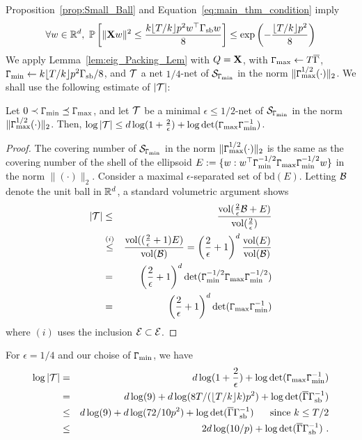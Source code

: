 Proposition~\ref{prop:Small_Ball} and Equation~\eqref{eq:main_thm_condition} imply
\begin{eqnarray}\label{eq:one_w}
\forall \direc \in \R^{d},~\Pr\left[ \|\matX \direc\|^2 \le \frac{k\lfloor T/k\rfloor p^2 \direc^\top \Gamsb \direc }{8}\right] \le \exp\left( - \frac{\floor{T/k}p^2}{8}\right) %
\end{eqnarray}
We apply Lemma~\ref{lem:eig_Packing_Lem} with $Q =  \mathbf{X}$, with $\mathtt{\Gamma}_{\max} \leftarrow T\overline{\Gamma}$, $\mathtt{\Gamma}_{\min} \leftarrow k \lfloor T/k\rfloor p^2 \Gamma_{\mathrm{sb}}/8$, and $\mathcal{T}$ a net $1/4$-net of $\mathcal{S}_{\mathtt{\Gamma}_{\min}}$ in the norm $\|\mathtt{\Gamma}_{\max}^{1/2}(\cdot)\|_2$. We shall use the following estimate of $|\mathcal{T}|$:
\begin{lem}\label{lem:covering_number} Let $0 \prec \mathtt{\Gamma}_{\min} \preceq \mathtt{\Gamma}_{\max}$, and let $\mathcal{T}$ be a minimal $\epsilon \le 1/2$-net of $\mathcal{S}_{\mathtt{\Gamma}_{\min}}$ in the norm $\|\mathtt{\Gamma}_{\max}^{1/2}(\cdot)\|_2$. Then, $\log |\mathcal{T}| \le d\log(1+\frac{2}{\epsilon}) + \log \det (\mathtt{\Gamma}_{\max} \mathtt{\Gamma}_{\min}^{-1})$. 
\end{lem}
\begin{proof} The covering number of $\mathcal{S}_{\mathtt{\Gamma}_{\min}}$ in the norm $\|\mathtt{\Gamma}_{\max}^{1/2}(\cdot)\|_2$ is the same as the covering number of the shell of the ellipsoid $E := \{w: w^{\top} \mathtt{\Gamma}_{\min}^{-1/2}\mathtt{\Gamma}_{\max} \mathtt{\Gamma}_{\min}^{-1/2}w\}$ in the norm $\|(\cdot)\|_2$. Consider a maximal $\epsilon$-separated set of $\mathrm{bd}(E)$. Letting $\mathcal{B}$ denote the unit ball in $\mathbb{R}^d$, a standard volumetric argument shows 
\begin{eqnarray*}
|\mathcal{T}| &\le& \frac{\mathrm{vol}(\frac{2}{\epsilon}\mathcal{B} + E)}{\mathrm{vol}(\frac{2}{\epsilon})} \\
&\overset{(i)}{\le}& \frac{\mathrm{vol}((\frac{2}{\epsilon}+1)E)}{\mathrm{vol}(\mathcal{B})} = \left(\frac{2}{\epsilon}+1\right)^d\frac{\mathrm{vol}(E)}{\mathrm{vol}(\mathcal{B})} \\
&=& \left(\frac{2}{\epsilon}+1\right)^d \det(\mathtt{\Gamma}_{\min}^{-1/2}\mathtt{\Gamma}_{\max} \mathtt{\Gamma}_{\min}^{-1/2})\\
&=& \left(\frac{2}{\epsilon}+1\right)^d \det(\mathtt{\Gamma}_{\max} \mathtt{\Gamma}_{\min}^{-1})\\
\end{eqnarray*}
where $(i)$ uses the inclusion $\mathcal{E} \subset \mathcal{E}$. 
\end{proof}
For $\epsilon = 1/4$ and our choise of $\mathtt{\Gamma}_{\min}$, we have
\begin{eqnarray}
\log |\mathcal{T}| &=& d\log(1+\frac{2}{\epsilon}) + \log \det (\mathtt{\Gamma}_{\max} \mathtt{\Gamma}_{\min}^{-1})\\
&=& d\log(9) + d \log (8T/(\lfloor T/k\rfloor k) p^2) +  \log \det (\overline{\Gamma} \Gamma_{\mathrm{sb}}^{-1})\nonumber\\
&\le& d\log(9) + d \log (72/ 10p^2) +  \log \det (\overline{\Gamma} \Gamma_{\mathrm{sb}}^{-1})~\quad \text{ since } k \le T/2\nonumber\\
&\le& 2d\log(10/ p) +  \log \det (\overline{\Gamma} \Gamma_{\mathrm{sb}}^{-1})~ \label{eq:calt_bound}.
\end{eqnarray}
